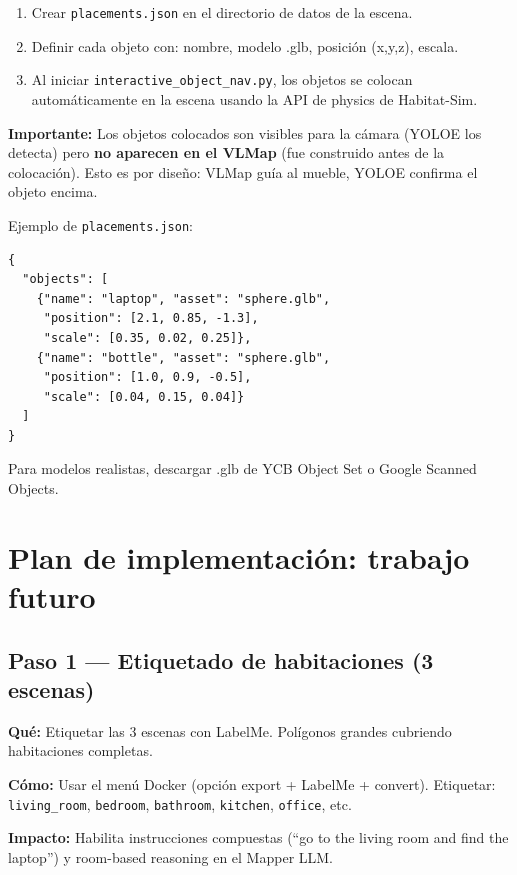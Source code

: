 \documentclass[11pt,a4paper]{article}
\begin{document}
\begin{enumerate}
    \item Crear \texttt{placements.json} en el directorio de datos de la escena.
    \item Definir cada objeto con: nombre, modelo .glb, posición (x,y,z), escala.
    \item Al iniciar \texttt{interactive\_object\_nav.py}, los objetos se colocan automáticamente en la escena usando la API de physics de Habitat-Sim.
\end{enumerate}

\textbf{Importante:} Los objetos colocados son visibles para la cámara (YOLOE los detecta) pero \textbf{no aparecen en el VLMap} (fue construido antes de la colocación). Esto es por diseño: VLMap guía al mueble, YOLOE confirma el objeto encima.

Ejemplo de \texttt{placements.json}:
\begin{verbatim}
{
  "objects": [
    {"name": "laptop", "asset": "sphere.glb",
     "position": [2.1, 0.85, -1.3],
     "scale": [0.35, 0.02, 0.25]},
    {"name": "bottle", "asset": "sphere.glb",
     "position": [1.0, 0.9, -0.5],
     "scale": [0.04, 0.15, 0.04]}
  ]
}
\end{verbatim}

Para modelos realistas, descargar .glb de YCB Object Set o Google Scanned Objects.

\section{Plan de implementación: trabajo futuro}

\subsection{Paso 1 --- Etiquetado de habitaciones (3 escenas)}

\textbf{Qué:} Etiquetar las 3 escenas con LabelMe. Polígonos grandes cubriendo habitaciones completas.

\textbf{Cómo:} Usar el menú Docker (opción export + LabelMe + convert). Etiquetar: \texttt{living\_room}, \texttt{bedroom}, \texttt{bathroom}, \texttt{kitchen}, \texttt{office}, etc.

\textbf{Impacto:} Habilita instrucciones compuestas (``go to the living room and find the laptop'') y room-based reasoning en el Mapper LLM.
\end{document}
